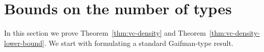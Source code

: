 \section{Bounds on the number of types}\label{sec:types}

In this section we prove Theorem~\ref{thm:vc-density} and Theorem~\ref{thm:vc-density-lower-bound}. 
We start with formulating a standard Gaifman-type result.
%
%
%


